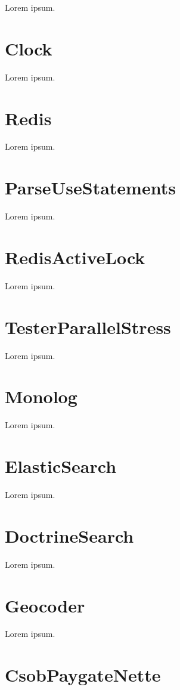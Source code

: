 Lorem ipsum.

\section{Clock}

Lorem ipsum.

\section{Redis}

Lorem ipsum.

\section{ParseUseStatements}

Lorem ipsum.

\section{RedisActiveLock}

Lorem ipsum.

\section{TesterParallelStress}

Lorem ipsum.

\section{Monolog}

Lorem ipsum.

\section{ElasticSearch}

Lorem ipsum.

\section{DoctrineSearch}

Lorem ipsum.

\section{Geocoder}

Lorem ipsum.

\section{CsobPaygateNette}

